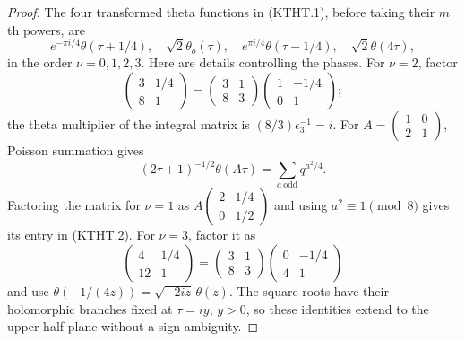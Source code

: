 \begin{proof}
The four transformed theta functions in (KTHT.1), before taking
their $m$th powers, are
\[
 e^{-\pi i/4}\theta(\tau+1/4),\quad
 \sqrt2\theta_o(\tau),\quad
 e^{\pi i/4}\theta(\tau-1/4),\quad
 \sqrt2\theta(4\tau),                                  \tag{KTHT.2}
\]
in the order $\nu=0,1,2,3$.
Here are details controlling the phases.  For $\nu=2$, factor
\[
 \begin{pmatrix}3&1/4\\8&1\end{pmatrix}
 =\begin{pmatrix}3&1\\8&3\end{pmatrix}
  \begin{pmatrix}1&-1/4\\0&1\end{pmatrix};
\]
the theta multiplier of the integral matrix is
$(8/3)\epsilon_3^{-1}=i$.
For $A=\left(\begin{smallmatrix}1&0\\2&1\end{smallmatrix}\right)$,
Poisson summation gives
\[
 (2\tau+1)^{-1/2}\theta(A\tau)
     =\sum_{a\ \mathrm{odd}}q^{a^2/4}.
\]
Factoring the matrix for $\nu=1$ as
$A\left(\begin{smallmatrix}2&1/4\\0&1/2\end{smallmatrix}\right)$
and using $a^2\equiv1\pmod8$ gives its entry in (KTHT.2).
For $\nu=3$, factor it as
\[
 \begin{pmatrix}4&1/4\\12&1\end{pmatrix}
 =\begin{pmatrix}3&1\\8&3\end{pmatrix}
  \begin{pmatrix}0&-1/4\\4&1\end{pmatrix}
\]
and use $\theta(-1/(4z))=\sqrt{-2iz}\,\theta(z)$.
The square roots have their holomorphic branches fixed at
$\tau=iy$, $y>0$, so these identities extend to the upper
half-plane without a sign ambiguity.


\end{proof}
